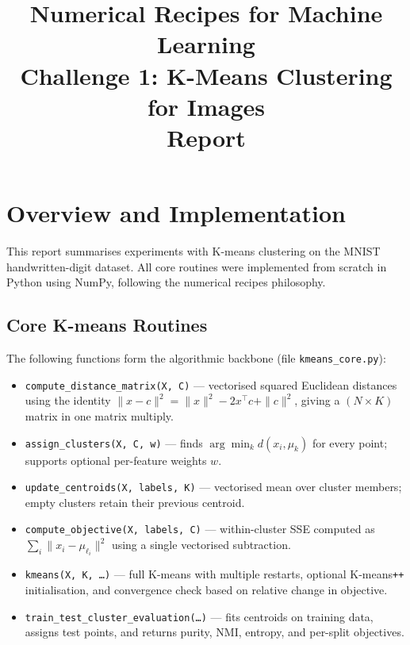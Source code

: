 \documentclass[11pt]{article}
\title{\textbf{Numerical Recipes for Machine Learning}\\
Challenge 1: K-Means Clustering for Images\\[0.5em]
\large Report}
\author{}
\date{}
\begin{document}
\maketitle
\tableofcontents
\newpage

\section{Overview and Implementation}

This report summarises experiments with K-means clustering on the
MNIST handwritten-digit dataset.
All core routines were implemented from scratch in Python using NumPy,
following the numerical recipes philosophy.

\subsection{Core K-means Routines}

The following functions form the algorithmic backbone (file \texttt{kmeans\_core.py}):

\begin{itemize}[itemsep=2pt]
    \item \texttt{compute\_distance\_matrix(X, C)} — vectorised squared Euclidean
          distances using the identity
          $\|x - c\|^2 = \|x\|^2 - 2x^\top c + \|c\|^2$, giving a
          $(N\times K)$ matrix in one matrix multiply.
    \item \texttt{assign\_clusters(X, C, w)} — finds \(\arg\min_k d(x_i, \mu_k)\)
          for every point; supports optional per-feature weights \(w\).
    \item \texttt{update\_centroids(X, labels, K)} — vectorised mean over cluster
          members; empty clusters retain their previous centroid.
    \item \texttt{compute\_objective(X, labels, C)} — within-cluster SSE computed
          as \(\sum_i \|x_i - \mu_{\ell_i}\|^2\) using a single vectorised
          subtraction.
    \item \texttt{kmeans(X, K, \ldots)} — full K-means with multiple restarts,
          optional K-means\texttt{++} initialisation, and convergence check
          based on relative change in objective.
    \item \texttt{train\_test\_cluster\_evaluation(\ldots)} — fits centroids on
          training data, assigns test points, and returns purity, NMI, entropy,
          and per-split objectives.
\end{itemize}
\end{document}

